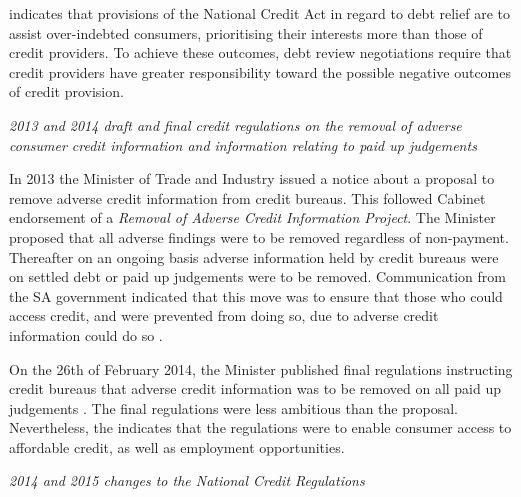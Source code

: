 \documentclass[
  letterpaper,
  DIV=11,
  numbers=noendperiod]{scrartcl}
\begin{document}
\citet{roestoff2009} indicates that provisions of the National Credit
Act in regard to debt relief are to assist over-indebted consumers,
prioritising their interests more than those of credit providers. To
achieve these outcomes, debt review negotiations require that credit
providers have greater responsibility toward the possible negative
outcomes of credit provision.

\emph{2013 and 2014 draft and final credit regulations on the removal of
adverse consumer credit information and information relating to paid up
judgements}

In 2013 the Minister of Trade and Industry issued a notice about a
proposal to remove adverse credit information from credit bureaus. This
followed Cabinet endorsement of a \emph{Removal of Adverse Credit
Information Project}. The Minister proposed that all adverse findings
were to be removed regardless of non-payment. Thereafter on an ongoing
basis adverse information held by credit bureaus were on settled debt or
paid up judgements were to be removed. Communication from the SA
government indicated that this move was to ensure that those who could
access credit, and were prevented from doing so, due to adverse credit
information could do so \citep{sagov2013}.

On the 26th of February 2014, the Minister published final regulations
instructing credit bureaus that adverse credit information was to be
removed on all paid up judgements \citep{regulations2014a}. The final
regulations were less ambitious than the proposal. Nevertheless, the
\citet{ncrnd} indicates that the regulations were to enable consumer
access to affordable credit, as well as employment opportunities.

\emph{2014 and 2015 changes to the National Credit Regulations}
\end{document}

